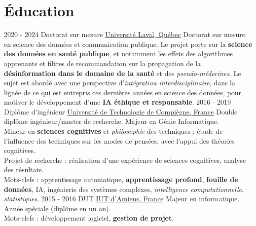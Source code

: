 \documentclass[a4paper]{twentysecondcv} %
\begin{document}
\makeprofile %


\section{Éducation}

\begin{twenty} %
    \twentyitem
    	{2020 - 2024}
        {}
        {Doctorat sur mesure}
        {\href{https://www.ulaval.ca/}{Université Laval, Québec}}
        {}
        {Doctorat sur mesure en science des données et communication publique. Le projet porte sur la \textbf{science des données en santé publique}, et notamment les effets des algorithmes apprenants et filtres de recommandation sur la propagation de la \textbf{désinformation dans le domaine de la santé} et des \textit{pseudo-médecines}. Le sujet est abordé avec une perspective d'\textit{intégration interdisciplinaire}, dans la lignée de ce qui est entrepris ces dernières années en science des données, pour motiver le développement d’une \textbf{IA éthique et responsable}.}
	\twentyitem
    	{2016 - 2019}
        {}
        {Diplôme d'ingénieur}
        {\href{https://www.utc.fr/}{Université de Technologie de Compiègne, France}}
        {}
        {Double diplôme ingénieur/master de recherche. Majeur en Génie Informatique.\\Mineur en \textbf{sciences cognitives} et \textit{philosophie} des techniques : étude de l'influence des techniques sur les modes de pensées, avec l'appui des théories cognitives.\\Projet de recherche : réalisation d'une expérience de sciences cognitives, analyse des résultats.\\Mots-clefs : apprentissage automatique, \textbf{apprentissage profond}, \textbf{fouille de données}, IA, ingénierie des systèmes complexes, \textit{intelligence computationnelle}, \textit{statistiques}.}
	\twentyitem
    	{2015 - 2016}
        {}
        {DUT}
        {\href{http://www.iut-amiens.fr/}{IUT d'Amiens, France}}
        {}
        {Majeur en informatique.\\Année spéciale (diplôme en un an).\\Mots-clefs : développement logiciel, \textbf{gestion de projet}.}
\end{twenty}
\end{document}
